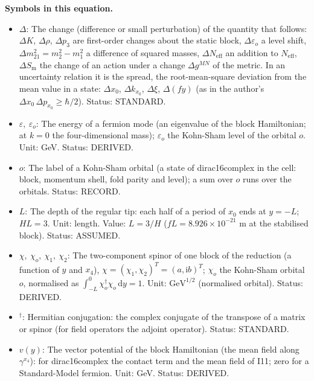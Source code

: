 \documentclass[
  10pt,
]{article}
\providecommand{\tightlist}{%
  \setlength{\itemsep}{0pt}\setlength{\parskip}{0pt}}
\begin{document}
\textbf{Symbols in this equation.}

\begin{itemize}
\tightlist
\item
  \(\Delta\): The change (difference or small perturbation) of the
  quantity that follows: \(\Delta K\), \(\Delta\rho\), \(\Delta p_3\)
  are first-order changes about the static block,
  \(\Delta\varepsilon_o\) a level shift,
  \(\Delta m^2_{21} = m_2^2 - m_1^2\) a difference of squared masses,
  \(\Delta N_{\mathrm{eff}}\) an addition to \(N_{\mathrm{eff}}\),
  \(\Delta S_{\mathrm{m}}\) the change of an action under a change
  \(\Delta g^{MN}\) of the metric. In an uncertainty relation it is the
  spread, the root-mean-square deviation from the mean value in a state:
  \(\Delta x_0\), \(\Delta k_{x_0}\), \(\Delta\xi\), \(\Delta(fy)\) (as
  in the author's \(\Delta x_0\,\Delta p_{x_0} \ge \hbar/2\)). Status:
  STANDARD.
\item
  \(\varepsilon,\ \varepsilon_o\): The energy of a fermion mode (an
  eigenvalue of the block Hamiltonian; at \(k = 0\) the four-dimensional
  mass); \(\varepsilon_o\) the Kohn-Sham level of the orbital \(o\).
  Unit: GeV. Status: DERIVED.
\item
  \(o\): The label of a Kohn-Sham orbital (a state of dirac16complex in
  the cell: block, momentum shell, fold parity and level); a sum over
  \(o\) runs over the orbitals. Status: RECORD.
\item
  \(L\): The depth of the regular tip: each half of a period of \(x_0\)
  ends at \(y = -L\); \(HL = 3\). Unit: length. Value: \(L = 3/H\)
  (\(fL = 8.926\times10^{-21}\) m at the stabilised block). Status:
  ASSUMED.
\item
  \(\chi,\ \chi_o,\ \chi_1,\ \chi_2\): The two-component spinor of one
  block of the reduction (a function of \(y\) and \(x_4\)),
  \(\chi = (\chi_1, \chi_2)^T = (a, \mathrm{i}b)^T\); \(\chi_o\) the
  Kohn-Sham orbital \(o\), normalised as
  \(\int_{-L}^{0}\chi_o^\dagger\chi_o\,\mathrm{d}y = 1\). Unit:
  \(\mathrm{GeV}^{1/2}\) (normalised orbital). Status: DERIVED.
\item
  \({}^\dagger\): Hermitian conjugation: the complex conjugate of the
  transpose of a matrix or spinor (for field operators the adjoint
  operator). Status: STANDARD.
\item
  \(v(y)\): The vector potential of the block Hamiltonian (the mean
  field along \(\gamma^{x_4}\)): for dirac16complex the contact term and
  the mean field of I11; zero for a Standard-Model fermion. Unit: GeV.
  Status: DERIVED.

\end{itemize}
\end{document}
